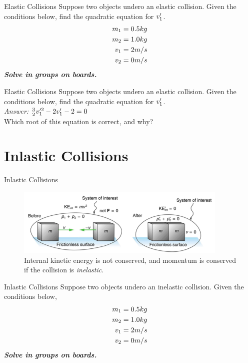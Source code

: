 \documentclass{beamer}
\begin{document}
\begin{frame}{Elastic Collisions}
Suppose two objects undero an elastic collision.  Given the conditions below, find the quadratic equation for $v_{\rm 1}'$.
\begin{align}
m_{\rm 1} &= 0.5 kg \\
m_{\rm 2} &= 1.0 kg \\
v_{\rm 1} &= 2 m/s \\
v_{\rm 2} &= 0 m/s
\end{align}
\textit{\textbf{Solve in groups on boards.}}
\end{frame}

\begin{frame}{Elastic Collisions}
Suppose two objects undero an elastic collision.  Given the conditions below, find the quadratic equation for $v_{\rm 1}'$. \\ \vspace{0.5cm}
\textit{Answer:} $\frac{3}{2}v_{\rm 1}'^2 - 2v_{\rm 1}' - 2 = 0$ \\
\vspace{0.5cm}
Which root of this equation is correct, and why?
\end{frame}

\section{Inlastic Collisions}

\begin{frame}{Inlastic Collisions}
\begin{figure}
\centering
\includegraphics[width=0.9\textwidth]{figures/inelastic.png}
\caption{\label{fig:inelastic} Internal kinetic energy is not conserved, and momentum is conserved if the collision is \textit{inelastic}.}
\end{figure}
\end{frame}

\begin{frame}{Inlastic Collisions}
Suppose two objects undero an inelastic collision.  Given the conditions below,
\begin{align}
m_{\rm 1} &= 0.5 kg \\
m_{\rm 2} &= 1.0 kg \\
v_{\rm 1} &= 2 m/s \\
v_{\rm 2} &= 0 m/s
\end{align}
\textit{\textbf{Solve in groups on boards.}}
\end{frame}
\end{document}
